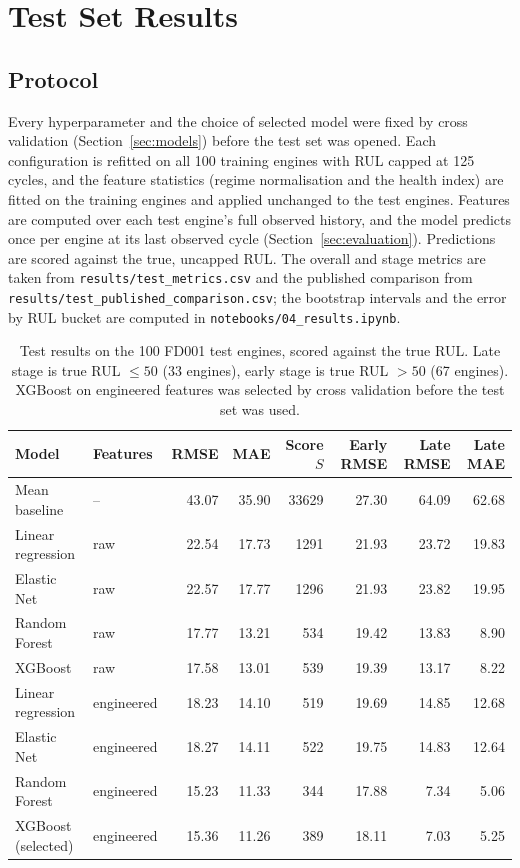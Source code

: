 \section{Test Set Results}
\label{sec:results}

\subsection{Protocol}
Every hyperparameter and the choice of selected model were fixed by cross
validation (Section~\ref{sec:models}) before the test set was opened. Each
configuration is refitted on all 100 training engines with RUL capped at
125 cycles, and the feature statistics (regime normalisation and the health
index) are fitted on the training engines and applied unchanged to the test
engines. Features are computed over each test engine's full observed
history, and the model predicts once per engine at its last observed cycle
(Section~\ref{sec:evaluation}). Predictions are scored against the true,
uncapped RUL. The overall and stage metrics are taken from
\texttt{results/test\_metrics.csv} and the published comparison from
\texttt{results/test\_published\_comparison.csv}; the bootstrap intervals
and the error by RUL bucket are computed in \texttt{notebooks/04\_results.ipynb}.

\begin{table}[t]
\centering
\caption{Test results on the 100 FD001 test engines, scored against the
true RUL. Late stage is true RUL $\le 50$ (33 engines), early stage is
true RUL $> 50$ (67 engines). XGBoost on engineered features was selected
by cross validation before the test set was used.}
\label{tab:test-results}
\begin{tabular}{llrrrrrr}
\hline
Model & Features & RMSE & MAE & Score $S$ & Early RMSE & Late RMSE & Late MAE \\
\hline
Mean baseline     & --         & 43.07 & 35.90 & 33629 & 27.30 & 64.09 & 62.68 \\
Linear regression & raw        & 22.54 & 17.73 & 1291  & 21.93 & 23.72 & 19.83 \\
Elastic Net       & raw        & 22.57 & 17.77 & 1296  & 21.93 & 23.82 & 19.95 \\
Random Forest     & raw        & 17.77 & 13.21 & 534   & 19.42 & 13.83 & 8.90 \\
XGBoost           & raw        & 17.58 & 13.01 & 539   & 19.39 & 13.17 & 8.22 \\
Linear regression & engineered & 18.23 & 14.10 & 519   & 19.69 & 14.85 & 12.68 \\
Elastic Net       & engineered & 18.27 & 14.11 & 522   & 19.75 & 14.83 & 12.64 \\
Random Forest     & engineered & 15.23 & 11.33 & 344   & 17.88 & 7.34  & 5.06 \\
XGBoost (selected) & engineered & 15.36 & 11.26 & 389  & 18.11 & 7.03  & 5.25 \\
\hline
\end{tabular}
\end{table}


